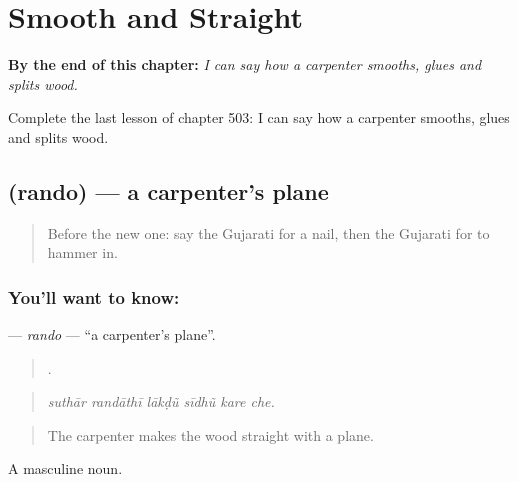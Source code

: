 
\chapter{Smooth and Straight}
\label{ch:gu-smooth-and-straight}

\begin{chapteropening}
\textbf{By the end of this chapter:} \emph{I can say how a carpenter smooths, glues and splits wood.}

Complete the last lesson of chapter 503: I can say how a carpenter smooths, glues and splits wood.
\end{chapteropening}

\section[\texorpdfstring{\gu{રંદો} (rando)}{રંદો (rando)}]{ (rando) — a carpenter's plane}

\label{lesson:GU-C503-rando}



\begin{quote}
Before the new one: say the Gujarati for a nail, then the Gujarati for to hammer in.
\end{quote}

\subsection*{You'll want to know: }
\textbf{} — \emph{rando} — \textquotedblleft{}a carpenter's plane\textquotedblright{}.

\begin{quote}
     .
\end{quote}

\begin{quote}
\emph{suthār randāthī lākḍũ sīdhũ kare che.}
\end{quote}

\begin{quote}
The carpenter makes the wood straight with a plane.
\end{quote}

A masculine noun.


